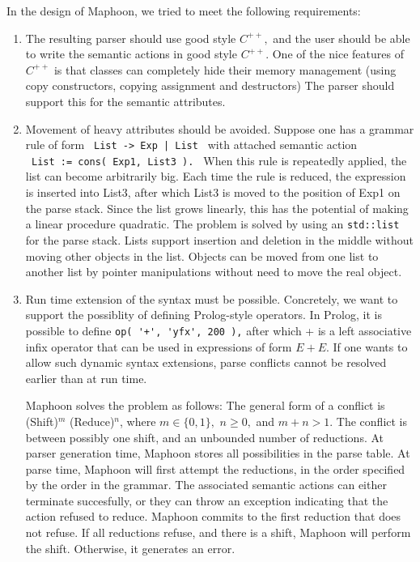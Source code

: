 \documentclass{article}
\begin{document}
\noindent
In the design of Maphoon, we tried to meet the following requirements:
\begin{enumerate}
\item
   The resulting parser should use good style $ C^{++}, $ 
   and the user should be able to write the semantic actions in good style 
   $ C^{++}. $ 
   One of the nice features of $ C^{++} $ is that classes can 
   completely hide their memory management (using copy constructors,
   copying assignment and destructors)
   The parser should support this for the semantic attributes.
\item
   Movement of heavy attributes should be avoided. Suppose one has a 
   grammar rule of form \verb+ List -> Exp | List + with attached 
   semantic action \\
   \verb+ List := cons( Exp1, List3 ). +
   When this rule is repeatedly applied, the list can become arbitrarily big. 
   Each time the rule is reduced,  
   the expression is inserted into List3, after which List3
   is moved to the position of Exp1 on the parse stack. 
   Since the list grows linearly, this has the potential of making
   a linear procedure quadratic.
   The problem is solved by using an \verb+std::list+ for the parse stack. 
   Lists support insertion and deletion in the middle without 
   moving other objects in the list. Objects can be moved from one
   list to another list by pointer manipulations without need to move
   the real object. 
\item
   Run time extension of the syntax must be possible. Concretely,
   we want to support the possiblity of defining Prolog-style operators.
   In Prolog, it is possible to define \verb&op( '+', 'yfx', 200 ),& 
   after which + is a left associative infix operator that can be used 
   in expressions of form $ E + E. $ 
   If one wants to allow such dynamic syntax extensions, parse 
   conflicts cannot be resolved earlier than at run time. 
   
   \noindent
   Maphoon solves the problem as follows: The general form of a conflict
   is (Shift)$^m$ (Reduce)$^n$, where $ m \in \{ 0, 1 \}, $ 
   $ n \geq 0, $ and $ m+n > 1. $
   The conflict is between possibly one shift,
   and an unbounded number of reductions. At parser generation time,
   Maphoon stores all possibilities in the parse table.
   At parse time, Maphoon will first attempt the reductions,
   in the order specified by the order in the grammar. The associated
   semantic actions can either terminate succesfully, or they can throw an
   exception indicating that the action refused to reduce.
   Maphoon commits to the first reduction that does not refuse. 
   If all reductions refuse, and there is a shift, Maphoon will
   perform the shift. Otherwise, it generates an error.


\end{enumerate}
\end{document}
